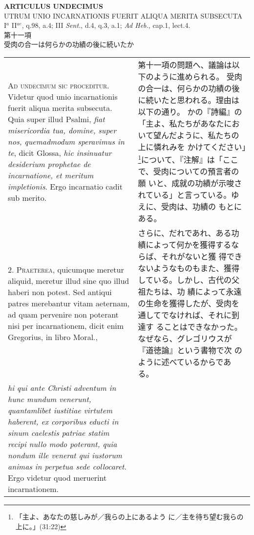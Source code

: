 \documentclass[10pt]{jsarticle} %
\begin{document}
\begin{center}
 {\Large {\bf ARTICULUS UNDECIMUS}}\\
 {\large UTRUM UNIO INCARNATIONIS FUERIT ALIQUA MERITA SUBSECUTA}\\
 {\footnotesize I$^a$ II$^{ae}$, q.98, a.4; III {\itshape Sent.}, d.4,
 q.3, a.1; {\itshape Ad Heb.}, cap.1, lect.4.}\\
 {\Large 第十一項\\受肉の合一は何らかの功績の後に続いたか}
\end{center}

\begin{longtable}{p{21em}p{21em}}


{\Huge A}{\scshape d undecimum sic proceditur}. Videtur quod unio incarnationis fuerit
aliqua merita subsecuta. Quia super illud Psalmi, {\itshape fiat misericordia tua,
domine, super nos, quemadmodum speravimus in te}, dicit Glossa,
 {\itshape hic
insinuatur desiderium prophetae de incarnatione, et meritum
impletionis}. Ergo incarnatio cadit sub merito.


&


第十一項の問題へ、議論は以下のように進められる。
受肉の合一は、何らかの功績の後に続いたと思われる。理由は以下の通り。
かの『詩編』の「主よ、私たちがあなたにおいて望んだように、私たちの上に憐れみを
 かけてください」\footnote{「主よ、あなたの慈しみが／我らの上にあるよう
 に／主を待ち望む我らの上に。」(31:22)}について、『注解』は「ここで、受肉についての預言者の願
 いと、成就の功績が示唆されている」と言っている。ゆえに、受肉は、功績の
 もとにある。


\\



2. {\scshape Praeterea}, quicumque meretur aliquid, meretur illud sine quo illud
haberi non potest. Sed antiqui patres merebantur vitam aeternam, ad quam
pervenire non poterant nisi per incarnationem, dicit enim Gregorius, in
libro Moral., 



&

さらに、だれであれ、ある功績によって何かを獲得するならば、それがないと獲
 得できないようなものもまた、獲得している。しかし、古代の父祖たちは、功
 績によって永遠の生命を獲得したが、受肉を通してでなければ、それに到達す
 ることはできなかった。なぜなら、グレゴリウスが『道徳論』という書物で次
 のように述べているからである。


\\

{\itshape hi qui ante Christi adventum in hunc mundum venerunt,
quantamlibet iustitiae virtutem haberent, ex corporibus educti in sinum
caelestis patriae statim recipi nullo modo poterant, quia nondum ille
venerat qui iustorum animas in perpetua sede collocaret}. Ergo videtur
quod meruerint incarnationem.



\end{longtable}
\end{document}
